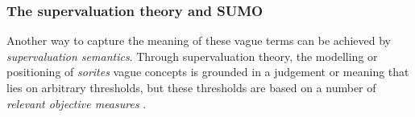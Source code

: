 \documentclass[11pt]{article}
\begin{document}
\subsubsection{The supervaluation theory and SUMO}
%


Another way to capture the meaning of these vague terms can be achieved by \textit{supervaluation semantics}. 
Through supervaluation theory, the modelling or positioning of \emph{sorites} vague concepts is grounded in a 
judgement or meaning that lies on arbitrary thresholds, but these thresholds are based on a number of \textit{relevant objective measures} \cite{Bennett06kr}. 
 
\end{document}
